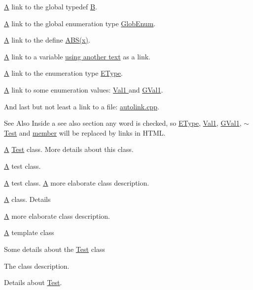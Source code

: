 \hyperlink{class_a}{A} link to the global typedef \hyperlink{class_b}{B}.

\hyperlink{class_a}{A} link to the global enumeration type \hyperlink{autolink_8cpp_a656d63cf384d2a6f23c2c18523a7bc5e}{Glob\-Enum}.

\hyperlink{class_a}{A} link to the define \hyperlink{define_8h_a996f7be338ccb40d1a2a5abc1ad61759}{A\-B\-S(x)}.

\hyperlink{class_a}{A} link to a variable \hyperlink{class_test_ae75d55c8cf6390227d51c0965a4de296}{using another text} as a link.

\hyperlink{class_a}{A} link to the enumeration type \hyperlink{class_test_a0653c5125502203305b6fe839e99ed01}{E\-Type}.

\hyperlink{class_a}{A} link to some enumeration values\-: \hyperlink{class_test_ad8d13fe56b896633273087859b89a1a3af621232782128e49458adf9069e126d4}{Val1 } and \hyperlink{autolink_8cpp_a656d63cf384d2a6f23c2c18523a7bc5ea0f016f49e4f3bcd072319b9d68bc927d}{G\-Val1}.

And last but not least a link to a file\-: \hyperlink{autolink_8cpp}{autolink.\-cpp}.

\begin{DoxySeeAlso}{See Also}
Inside a see also section any word is checked, so \hyperlink{class_test_a0653c5125502203305b6fe839e99ed01}{E\-Type}, \hyperlink{class_test_ad8d13fe56b896633273087859b89a1a3af621232782128e49458adf9069e126d4}{Val1}, \hyperlink{autolink_8cpp_a656d63cf384d2a6f23c2c18523a7bc5ea0f016f49e4f3bcd072319b9d68bc927d}{G\-Val1}, \hyperlink{class_test_a31b169208ad4fc5344a7b6b8e1fd00c1}{$\sim$\-Test} and \hyperlink{class_test_a703997077e40c222687a0ea2973a9ea1}{member} will be replaced by links in H\-T\-M\-L.
\end{DoxySeeAlso}
\hyperlink{class_a}{A} \hyperlink{class_test}{Test} class. More details about this class.

\hyperlink{class_a}{A} test class.

\hyperlink{class_a}{A} test class. \hyperlink{class_a}{A} more elaborate class description.

\hyperlink{class_a}{A} class. Details

\hyperlink{class_a}{A} more elaborate class description.

\hyperlink{class_a}{A} template class

Some details about the \hyperlink{class_test}{Test} class

The class description.

Details about \hyperlink{class_test}{Test}.

